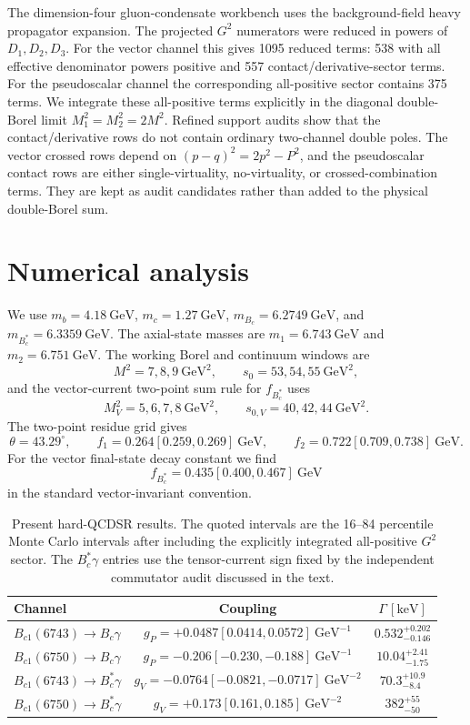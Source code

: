 \documentclass[aps,prd,preprint,nofootinbib,superscriptaddress]{revtex4-2}
\newcommand{\Bc}{B_c}
\newcommand{\Bcst}{B_c^\ast}
\newcommand{\Bcone}{B_{c1}}
\newcommand{\GeV}{\mathrm{GeV}}
\newcommand{\keV}{\mathrm{keV}}
\begin{document}
The dimension-four gluon-condensate workbench uses the background-field heavy
propagator expansion.  The projected \(G^2\) numerators were reduced in powers
of \(D_1,D_2,D_3\).  For the vector channel this gives 1095 reduced terms:
538 with all effective denominator powers positive and 557
contact/derivative-sector terms.  For the pseudoscalar channel the
corresponding all-positive sector contains 375 terms.  We integrate these
all-positive terms explicitly in the diagonal double-Borel limit
\(M_1^2=M_2^2=2M^2\).  Refined support audits show that the contact/derivative
rows do not contain ordinary two-channel double poles.  The vector crossed rows
depend on \((p-q)^2=2p^2-P^2\), and the pseudoscalar contact rows are either
single-virtuality, no-virtuality, or crossed-combination terms.  They are kept
as audit candidates rather than added to the physical double-Borel sum.

\section{Numerical analysis}
\label{sec:numerics}

We use \(m_b=4.18~\GeV\), \(m_c=1.27~\GeV\), \(m_{\Bc}=6.2749~\GeV\), and
\(m_{\Bcst}=6.3359~\GeV\).  The axial-state masses are
\(m_1=6.743~\GeV\) and \(m_2=6.751~\GeV\).  The working Borel and continuum
windows are
\[
M^2=7,8,9~\GeV^2,\qquad s_0=53,54,55~\GeV^2,
\]
and the vector-current two-point sum rule for \(f_{\Bcst}\) uses
\[
M_V^2=5,6,7,8~\GeV^2,\qquad s_{0,V}=40,42,44~\GeV^2.
\]
The two-point residue grid gives
\[
\theta=43.29^\circ,\qquad
f_1=0.264[0.259,0.269]~\GeV,\qquad
f_2=0.722[0.709,0.738]~\GeV .
\]
For the vector final-state decay constant we find
\[
f_{\Bcst}=0.435[0.400,0.467]~\GeV
\]
in the standard vector-invariant convention.

\begin{table}[t]
\centering
\caption{Present hard-QCDSR results.  The quoted intervals are the 16--84
percentile Monte Carlo intervals after including the explicitly integrated
all-positive \(G^2\) sector.  The \(\Bcst\gamma\) entries use the tensor-current
sign fixed by the independent commutator audit discussed in the text.}
\begin{tabular}{lcc}
\toprule
Channel & Coupling & \(\Gamma\,[\keV]\)\\
\midrule
\(\Bcone(6743)\to \Bc\gamma\)
& \(g_P=+0.0487[0.0414,0.0572]~\GeV^{-1}\)
& \(0.532^{+0.202}_{-0.146}\)\\
\(\Bcone(6750)\to \Bc\gamma\)
& \(g_P=-0.206[-0.230,-0.188]~\GeV^{-1}\)
& \(10.04^{+2.41}_{-1.75}\)\\
\(\Bcone(6743)\to \Bcst\gamma\)
& \(g_V=-0.0764[-0.0821,-0.0717]~\GeV^{-2}\)
& \(70.3^{+10.9}_{-8.4}\)\\
\(\Bcone(6750)\to \Bcst\gamma\)
& \(g_V=+0.173[0.161,0.185]~\GeV^{-2}\)
& \(382^{+55}_{-50}\)\\
\bottomrule
\end{tabular}
\label{tab:present-results}
\end{table}
\end{document}

